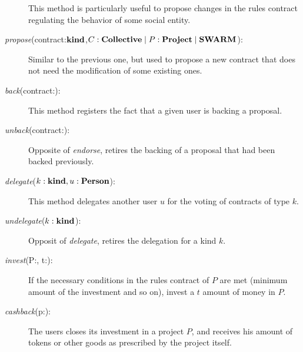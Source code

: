 \documentclass[submission, copyright,creativecommons,sharealike,noncommercial]{eptcs}
\begin{document}
\begin{description}
		This method is particularly useful to propose changes in the rules contract regulating the behavior of some social entity.
		
		\item[\emph{propose}(contract:$\textbf{kind}$,$C:\textbf{Collective} \mid P:\textbf{Project} \mid \textbf{SWARM}$):] Similar to the previous one, but used to propose a new contract that does not need the modification of some existing ones.
		
		\item[\emph{back}(contract:\kind):] This method registers the fact that a given user is backing a proposal.
		
		\item[\emph{unback}(contract:\kind):] Opposite of \emph{endorse}, retires the backing of a proposal that had been backed previously.
		
		\item[\emph{delegate}($k:\textbf{kind}, u:\textbf{Person}$):] This method delegates another user $u$ for the voting of contracts of type $k$.
		
		\item[\emph{undelegate}($k:\textbf{kind}$):] Opposit of \emph{delegate}, retires the delegation for a kind $k$.
		
		
		\item[\emph{invest}(P:\project, t:\token):] If the necessary conditions in the rules contract of $P$ are met (minimum amount of the investment and so on), invest a $t$ amount of money in $P$. 
		
		\item[\emph{cashback}(p:\project):] The users closes its investment in a project $P$, and receives his amount of tokens or other goods as prescribed by the project itself.
		
		
	\end{description}
	
	
\end{document}
